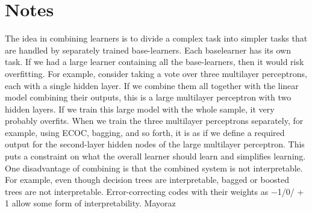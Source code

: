 \section{Notes}

The idea in combining learners is to divide a complex task into simpler tasks that are handled by separately trained base-learners. Each baselearner has its own task. If we had a large learner containing all the base-learners, then it would risk overfitting. For example, consider taking a vote over three multilayer perceptrons, each with a single hidden layer. If we combine them all together with the linear model combining their outputs, this is a large multilayer perceptron with two hidden layers. If we train this large model with the whole sample, it very probably overfits. When we train the three multilayer perceptrons separately, for example, using ECOC, bagging, and so forth, it is as if we define a required output for the second-layer hidden nodes of the large multilayer perceptron. This puts a constraint on what the overall learner should learn and simplifies learning. One disadvantage of combining is that the combined system is not interpretable. For example, even though decision trees are interpretable, bagged or boosted trees are not interpretable. Error-correcting codes with their weights as $-$1/0/ + 1 allow some form of interpretability. Mayoraz


